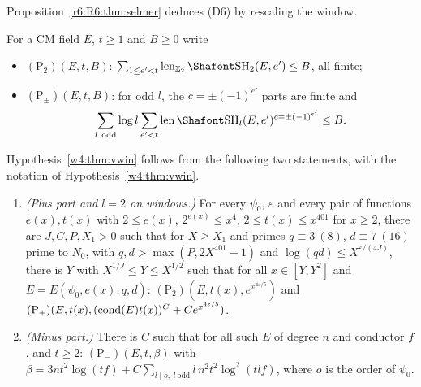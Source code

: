 Proposition~\ref{r6:R6:thm:selmer} deduces (D6) by rescaling the window.

For a CM field $E$, $t\ge1$ and $B\ge0$ write
\begin{itemize}[leftmargin=*,itemsep=1pt]
\item $(\mathrm P_2)(E,t,B)$: $\sum_{1\le e'<t}\len_{\mathbb Z_2}\Sha_2(E,e')\le B$, all finite;
\item $(\mathrm P_\pm)(E,t,B)$: for odd $l$, the $c=\pm(-1)^{e'}$ parts are finite and
\[
\sum_{l\ \mathrm{odd}}\log l\sum_{e'<t}\len\Sha_l(E,e')^{c=\pm(-1)^{e'}}\le B.
\]
\end{itemize}

\begin{theorem}[decomposition]\label{w4:thm:decomp}
Hypothesis~\ref{w4:thm:vwin} follows from the following two statements, with the notation of Hypothesis~\ref{w4:thm:vwin}.
\begin{enumerate}[leftmargin=*,label=(\Roman*)]
\item \emph{(Plus part and $l=2$ on windows.)} For every $\psi_0$, $\varepsilon$ and every pair of functions $e(x),t(x)$ with $2\le e(x)$, $2^{e(x)}\le x^4$, $2\le t(x)\le x^{401}$ for $x\ge2$, there are $J,C,P,X_1>0$ such that for $X\ge X_1$ and primes $q\equiv3\ (8)$, $d\equiv7\ (16)$ prime to $N_0$, with $q,d>\max(P,2X^{401}+1)$ and $\log(qd)\le X^{\varepsilon/(4J)}$, there is $Y$ with $X^{1/J}\le Y\le X^{1/2}$ such that for all $x\in[Y,Y^2]$ and $E=E(\psi_0,e(x),q,d)$: $(\mathrm P_2)(E,t(x),e^{x^{4\varepsilon/5}})$ and $(\mathrm P_+)(E,t(x),(\operatorname{cond}(E)t(x))^C+Ce^{x^{4\varepsilon/5}})$.
\item \emph{(Minus part.)} There is $C$ such that for all such $E$ of degree $n$ and conductor $f$, and $t\ge2$: $(\mathrm P_-)(E,t,\beta)$ with $\beta=3nt^2\log(tf)+C\sum_{l\mid o,\ l\ \mathrm{odd}}l\,n^2t^2\log^2(tlf)$, where $o$ is the order of $\psi_0$.
\end{enumerate}
\end{theorem}

